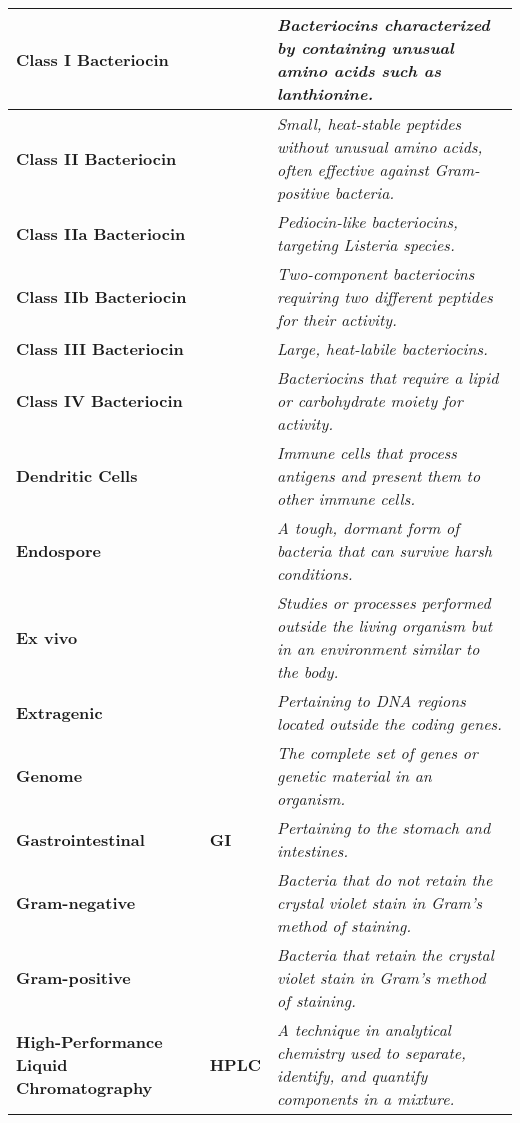 \begin{longtable}{| p{5cm} | p{2cm} | p{7.5cm} |}
    \hline
    \textbf{Class I Bacteriocin} &  & \textit{Bacteriocins characterized by containing unusual amino acids such as lanthionine.} \\
    \hline
    \textbf{Class II Bacteriocin} &  & \textit{Small, heat-stable peptides without unusual amino acids, often effective against Gram-positive bacteria.} \\
    \hline
    \textbf{Class IIa Bacteriocin} &  & \textit{Pediocin-like bacteriocins, targeting \textit{Listeria} species.} \\
    \hline
    \textbf{Class IIb Bacteriocin} &  & \textit{Two-component bacteriocins requiring two different peptides for their activity.} \\
    \hline
    \textbf{Class III Bacteriocin} &  & \textit{Large, heat-labile bacteriocins.} \\
    \hline
    \textbf{Class IV Bacteriocin} &  & \textit{Bacteriocins that require a lipid or carbohydrate moiety for activity.} \\
    \hline
    \textbf{Dendritic Cells} &  & \textit{Immune cells that process antigens and present them to other immune cells.} \\
    \hline
    \textbf{Endospore} &  & \textit{A tough, dormant form of bacteria that can survive harsh conditions.} \\
    \hline
    \textbf{Ex vivo} &  & \textit{Studies or processes performed outside the living organism but in an environment similar to the body.} \\
    \hline
    \textbf{Extragenic} &  & \textit{Pertaining to DNA regions located outside the coding genes.} \\
    \hline
    \textbf{Genome} &  & \textit{The complete set of genes or genetic material in an organism.} \\
    \hline
    \textbf{Gastrointestinal} & \textbf{GI} & \textit{Pertaining to the stomach and intestines.} \\
    \hline
    \textbf{Gram-negative} &  & \textit{Bacteria that do not retain the crystal violet stain in Gram's method of staining.} \\
    \hline
    \textbf{Gram-positive} &  & \textit{Bacteria that retain the crystal violet stain in Gram's method of staining.} \\
    \hline
    \textbf{High-Performance Liquid Chromatography} & \textbf{HPLC} & \textit{A technique in analytical chemistry used to separate, identify, and quantify components in a mixture.} \\

\end{longtable}

